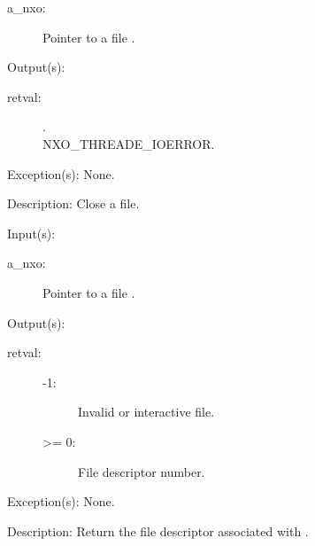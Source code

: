 \begin{capi}
\begin{capilist}
\begin{description}
		\item[a\_nxo: ]
			Pointer to a file .
		\end{description}
	\item[Output(s): ]
		\begin{description}\item[]
		\item[retval: ]
			\begin{description}\item[]
			\item[.]
			\item[
				{NXO_THREADE_IOERROR}.]
			\end{description}
		\end{description}
	\item[Exception(s): ] None.
	\item[Description: ]
		Close a file.
	\end{capilist}
\label{nxo_file_fd_get}
	\begin{capilist}
	\item[Input(s): ]
		\begin{description}\item[]
		\item[a\_nxo: ]
			Pointer to a file .
		\end{description}
	\item[Output(s): ]
		\begin{description}\item[]
		\item[retval: ]
			\begin{description}\item[]
			\item[-1: ]
				Invalid or interactive file.
			\item[>= 0: ]
				File descriptor number.
			\end{description}
		\end{description}
	\item[Exception(s): ] None.
	\item[Description: ]
		Return the file descriptor associated with .
	\end{capilist}
\label{nxo_file_read}
	\begin{capilist}

\end{capilist}
\end{capi}
